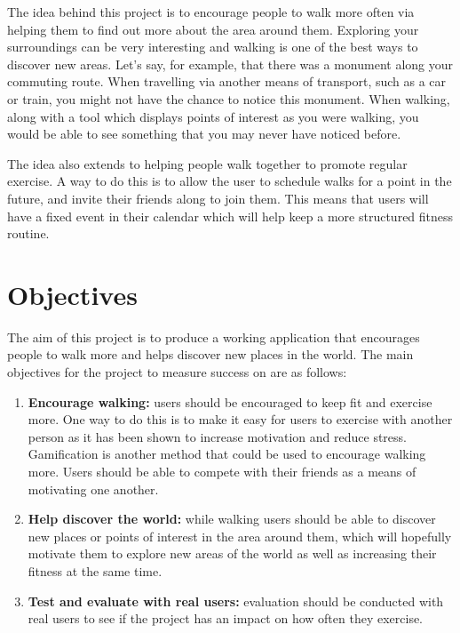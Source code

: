 The idea behind this project is to encourage people to walk more often via helping them to find out more about the area around them. Exploring your surroundings can be very interesting and walking is one of the best ways to discover new areas. Let's say, for example, that there was a monument along your commuting route. When travelling via another means of transport, such as a car or train, you might not have the chance to notice this monument. When walking, along with a tool which displays points of interest as you were walking, you would be able to see something that you may never have noticed before.

The idea also extends to helping people walk together to promote regular exercise. A way to do this is to allow the user to schedule walks for a point in the future, and invite their friends along to join them. This means that users will have a fixed event in their calendar which will help keep a more structured fitness routine.


\section{Objectives} \label{section:objectives}

The aim of this project is to produce a working application that encourages people to walk more and helps discover new places in the world. The main objectives for the project to measure success on are as follows:

\begin{enumerate}[label=\textbf{Obj \arabic*}]
  \item \textbf{Encourage walking:} users should be encouraged to keep fit and exercise more.  One way to do this is to make it easy for users to exercise with another person as it has been shown to increase motivation and reduce stress. Gamification is another method that could be used to encourage walking more. Users should be able to compete with their friends as a means of motivating one another.
  \item \textbf{Help discover the world:} while walking users should be able to discover new places or points of interest in the area around them, which will hopefully motivate them to explore new areas of the world as well as increasing their fitness at the same time.
  \item \textbf{Test and evaluate with real users:} evaluation should be conducted with real users to see if the project has an impact on how often they exercise.
\end{enumerate}







